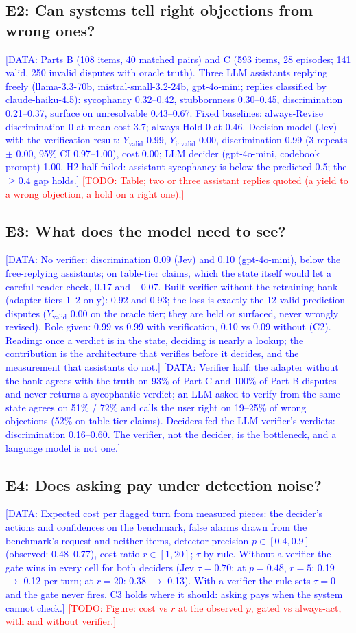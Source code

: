 \documentclass[preprint,12pt,3p,times]{elsarticle}
\newcommand{\todo}[1]{\textcolor{red}{[TODO: #1]}}
\newcommand{\done}[1]{\textcolor{blue}{[DATA: #1]}}   %
\begin{document}
\subsection{E2: Can systems tell right objections from wrong ones?}
\done{Parts B (108 items, 40 matched pairs) and C (593 items, 28 episodes; 141 valid, 250 invalid disputes with oracle truth). Three LLM assistants replying freely (llama-3.3-70b, mistral-small-3.2-24b, gpt-4o-mini; replies classified by claude-haiku-4.5): sycophancy 0.32--0.42, stubbornness 0.30--0.45, discrimination 0.21--0.37, surface on unresolvable 0.43--0.67. Fixed baselines: always-Revise discrimination 0 at mean cost 3.7; always-Hold 0 at 0.46. Decision model (Jev) with the verification result: $Y_\mathrm{valid}$ 0.99, $Y_\mathrm{invalid}$ 0.00, discrimination 0.99 (3 repeats $\pm$ 0.00, 95\% CI 0.97--1.00), cost 0.00; LLM decider (gpt-4o-mini, codebook prompt) 1.00. H2 half-failed: assistant sycophancy is below the predicted 0.5; the $\ge 0.4$ gap holds.} \todo{Table; two or three assistant replies quoted (a yield to a wrong objection, a hold on a right one).}
\subsection{E3: What does the model need to see?}
\done{No verifier: discrimination 0.09 (Jev) and 0.10 (gpt-4o-mini), below the free-replying assistants; on table-tier claims, which the state itself would let a careful reader check, 0.17 and $-0.07$. Built verifier without the retraining bank (adapter tiers 1--2 only): 0.92 and 0.93; the loss is exactly the 12 valid prediction disputes ($Y_\mathrm{valid}$ 0.00 on the oracle tier; they are held or surfaced, never wrongly revised). Role given: 0.99 vs 0.99 with verification, 0.10 vs 0.09 without (C2). Reading: once a verdict is in the state, deciding is nearly a lookup; the contribution is the architecture that verifies before it decides, and the measurement that assistants do not.} \done{Verifier half: the adapter without the bank agrees with the truth on 93\% of Part C and 100\% of Part B disputes and never returns a sycophantic verdict; an LLM asked to verify from the same state agrees on 51\% / 72\% and calls the user right on 19--25\% of wrong objections (52\% on table-tier claims). Deciders fed the LLM verifier's verdicts: discrimination 0.16--0.60. The verifier, not the decider, is the bottleneck, and a language model is not one.}
\subsection{E4: Does asking pay under detection noise?}
\done{Expected cost per flagged turn from measured pieces: the decider's actions and confidences on the benchmark, false alarms drawn from the benchmark's request and neither items, detector precision $p \in [0.4, 0.9]$ (observed: 0.48--0.77), cost ratio $r \in [1, 20]$; $\tau$ by rule. Without a verifier the gate wins in every cell for both deciders (Jev $\tau = 0.70$; at $p = 0.48$, $r = 5$: 0.19 $\to$ 0.12 per turn; at $r = 20$: 0.38 $\to$ 0.13). With a verifier the rule sets $\tau = 0$ and the gate never fires. C3 holds where it should: asking pays when the system cannot check.} \todo{Figure: cost vs $r$ at the observed $p$, gated vs always-act, with and without verifier.}
\end{document}
